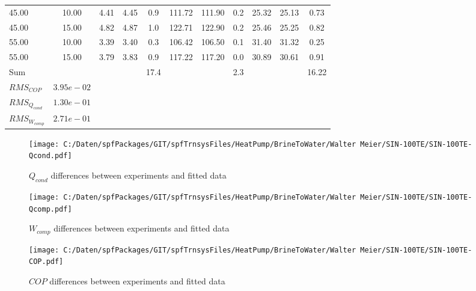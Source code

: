\documentclass[english]{SPFShortReport}
\begin{document}
\begin{table}[!ht]
\begin{small}
\begin{center}
{\begin{tabular}{l | c c c c c c c c c c }
45.00  & 10.00 & 4.41 & 4.45 & 0.9 & 111.72 & 111.90 & 0.2 & 25.32 & 25.13 & 0.73\\ 
45.00  & 15.00 & 4.82 & 4.87 & 1.0 & 122.71 & 122.90 & 0.2 & 25.46 & 25.25 & 0.82\\ 
55.00  & 10.00 & 3.39 & 3.40 & 0.3 & 106.42 & 106.50 & 0.1 & 31.40 & 31.32 & 0.25\\ 
55.00  & 15.00 & 3.79 & 3.83 & 0.9 & 117.22 & 117.20 & 0.0 & 30.89 & 30.61 & 0.91\\ 
\hline 
 Sum &  & &  & 17.4 &  &  & 2.3 & &  & 16.22\\ 
\hline 
 $RMS_{COP}$ & $3.95e-02$ \\ 
 $RMS_{Q_{cond}}$ & $1.30e-01$ \\ 
 $RMS_{W_{comp}}$ & $2.71e-01$ \\ 
\hline
\hline
\end{tabular}
}
\label{ErrorsTable}
\end{center}
\end{small}
\end{table}
\begin{figure}[!ht]
\begin{center}
\texttt{[image: C:/Daten/spfPackages/GIT/spfTrnsysFiles/HeatPump/BrineToWater/Walter Meier/SIN-100TE/SIN-100TE-Qcond.pdf]}
\caption{$Q_{cond}$ differences between experiments and fitted data}
\label{QcongFig}
\end{center}
\end{figure}
\begin{figure}[!ht]
\begin{center}
\texttt{[image: C:/Daten/spfPackages/GIT/spfTrnsysFiles/HeatPump/BrineToWater/Walter Meier/SIN-100TE/SIN-100TE-Qcomp.pdf]}
\caption{$W_{comp}$ differences between experiments and fitted data}
\label{QcompFig}
\end{center}
\end{figure}
\begin{figure}[!ht]
\begin{center}
\texttt{[image: C:/Daten/spfPackages/GIT/spfTrnsysFiles/HeatPump/BrineToWater/Walter Meier/SIN-100TE/SIN-100TE-COP.pdf]}
\caption{$COP$ differences between experiments and fitted data}
\label{COPFig}
\end{center}
\end{figure}
\end{document}

